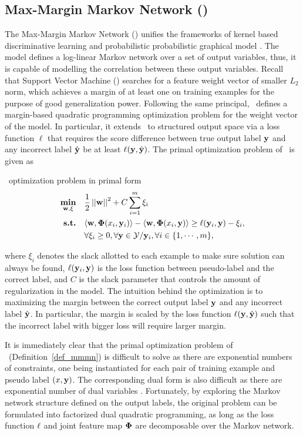 { 


%
\subsection{Max-Margin Markov Network (\mmmn)}

The Max-Margin Markov Network (\mmmn) unifies the frameworks of kernel based discriminative learning and probabilistic probabilistic graphical model \citep{Taskar04max}.
The model defines a log-linear Markov network over a set of output variables, thus, it is capable of modelling the correlation between these output variables.
Recall that Support Vector Machine (\svm) searches for a feature weight vector of smaller $L_2$ norm, which achieves a margin of at least one on training examples for the purpose of good generalization power.
Following the same principal, \mmmn\ defines a margin-based quadratic programming optimization problem for the weight vector of the model.
In particular, it extends \svm\ to structured output space via a loss function $\ell$ that requires the score difference between true output label $\mathbf {y}$ and any incorrect label $\hat{\mathbf {y}}$ be at least $\mathbf {\ell}(\mathbf {y},\hat{\mathbf {y}})$.
The primal optimization problem of \mmmn\ is given as
\begin{definition}{\mmmn\ optimization problem in primal form}\label{def_mmmn}
	\begin{align*}
		\underset{\mathbf {w},\mathbf{\xi}}{\textbf{min}} & \quad\frac{1}{2}\left|\left| \mathbf {w} \right|\right|^2 + C\sum_{i=1}^{m}\xi_i \\
		\textbf{s.t.} & \quad\langle \mathbf {w}, \mathbf{\Phi}(x_i,\mathbf {y}_i) \rangle - \langle \mathbf {w}, \mathbf{\Phi}(x_i,\mathbf {y}) \rangle \ge \mathbf {\ell}(\mathbf {y}_i,\mathbf {y})-\xi_i,\\
		& \quad \forall \xi_i\ge0, \forall \mathbf {y}\in\mathcal{Y}/\mathbf {y}_i, \forall i\in\{1,\cdots,m\},
	\end{align*}
\end{definition}
where $\xi_i$ denotes the slack allotted to each example to make sure solution can always be found, $\mathbf {\ell}(\mathbf {y}_i,\mathbf {y})$ is the loss function between pseudo-label and the correct label, and $C$ is the slack parameter that controls the amount of regularization in the model.
The intuition behind the optimization is to maximizing the margin between the correct output label $\mathbf {y}$ and any incorrect label $\hat{\mathbf {y}}$.
In particular, the margin is scaled by the loss function $\mathbf {\ell}(\mathbf {y},\hat{\mathbf {y}})$ such that the incorrect label with bigger loss will require larger margin. 

It is immediately clear that the primal optimization problem of \mmmn\ (Definition~\ref{def_mmmn}) is difficult to solve as there are exponential numbers of constraints, one being instantiated for each pair of training example and pseudo label $(x,\mathbf {y})$.
The corresponding dual form is also difficult as there are exponential number of dual variables \cite[p.~4]{Taskar04max}.
Fortunately, by exploring the Markov network structure defined on the output labels, the original problem can be formulated into factorized dual quadratic programming, as long as the loss function $\mathbf {\ell}$ and joint feature map $\mathbf{\Phi}$ are decomposable over the Markov network.

}
